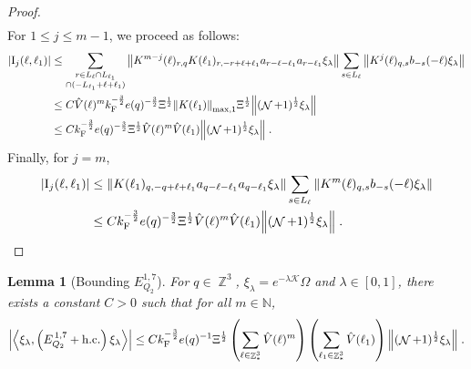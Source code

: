 \documentclass[12pt,a4paper]{article}
\numberwithin{equation}{section}
\newcommand{\cK}{\mathcal{K}}
\newcommand{\NNN}{\mathbb{N}}
\newcommand{\1}{\mathbb{I}}
\newcommand{\F}{\mathrm{F}}
\newcommand{\I}{\mathrm{I}}
\DeclareMathOperator{\Z}{\mathbb{Z}}
\DeclareMathOperator{\NN}{\mathcal{N}}
\newcommand{\half}{\frac{1}{2}}
\newcommand{\eva}[1]{\left\langle #1 \right\rangle}
\theoremstyle{plain}
\newtheorem{lemma}[theorem]{Lemma}
\theoremstyle{definition}
\theoremstyle{remark}
\theoremstyle{plain}
\theoremstyle{definition}
\theoremstyle{remark}
\begin{document}
\begin{proof}
\begin{align}
\end{align}
For $ 1 \le j \le m-1 $, we proceed as follows:
\begin{align}
	|\I_j(\ell, \ell_1)|
	&\leq \sum\limits_{\substack{r\in L_{\ell} \cap L_{\ell_1}\\ \cap (-L_{\ell_1}+\ell+\ell_1)}}
		\norm{ K^{m-j}(\ell)_{r,q} K(\ell_1)_{r,-r+\ell+\ell_1}  a_{r-\ell-\ell_1} a_{r-\ell_1} \xi_\lambda}
		\sum\limits_{s \in L_{\ell}}
		\norm{ K^j(\ell)_{q,s}  b_{-s}(-\ell) \xi_\lambda }\nonumber\\
	&\leq C \hat{V}(\ell)^m k_{\F}^{-\frac 32} e(q)^{-\frac 32} \Xi^\half
		\norm{K(\ell_1)}_{\max,1} \Xi^{\half}
		\norm{ (\NN+1)^\half \xi_\lambda} \nonumber\\
	&\leq C k_{\F}^{-\frac 32} e(q)^{-\frac 32} \Xi^\half
		\hat{V}(\ell)^m
		\hat{V}(\ell_1)
		\norm{ (\NN+1)^\half \xi_\lambda} \;. \label{eq:estEQ2152}
\end{align}
Finally, for $ j = m $,
\begin{align}
	|\I_j(\ell, \ell_1)|
	&\leq \norm{K(\ell_1)_{q,-q+\ell+\ell_1} a_{q-\ell-\ell_1}  a_{q-\ell_1} \xi_\lambda}
		\sum\limits_{ s \in L_{\ell}}
		\norm{ K^m(\ell)_{q,s}  b_{-s}(-\ell) \xi_\lambda }\nonumber\\
	&\leq C k_{\F}^{-\frac 32} e(q)^{-\frac 32} \Xi^\half
		\hat{V}(\ell)^m
		\hat{V}(\ell_1)
		\norm{(\NN+1)^\half\xi_\lambda} \;. \label{eq:estEQ2153}
\end{align}
\end{proof}


\begin{lemma}[Bounding $E_{Q_2}^{1,7}$]\label{lem:EQ217}
For $ q \in \Z^3 $, $\xi_\lambda = e^{-\lambda \cK} \Omega$ and $ \lambda \in [0,1] $, there exists a constant $ C > 0 $ such that for all $ m \in \NNN $,
\begin{align}
	\abs{\eva{\xi_\lambda,\left(E^{\,1,7}_{Q_2}+\mathrm{h.c.}\right) \xi_\lambda }}
	\leq C k_{\F}^{-\frac{3}{2}} e(q)^{-1} \Xi^{\half} \left(\sum\limits_{\ell\in \Z^3_*} \hat{V}(\ell)^m \right) \left(\sum\limits_{\ell_1\in \Z^3_*} \hat{V}(\ell_1) \right) \norm{(\NN+1)^\half \xi_\lambda } \;. \label{eq:estEQ217}
\end{align}
\end{lemma}
\end{document}

